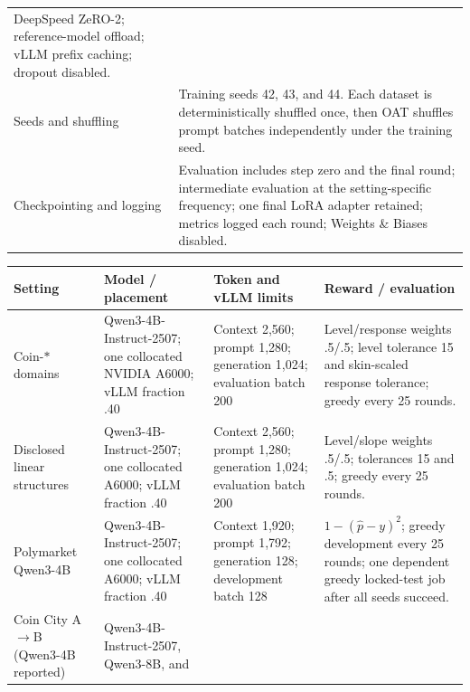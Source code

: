 \begin{center}
\begin{minipage}{\linewidth}
\begin{tabular}{p{.29\linewidth}p{.66\linewidth}}
DeepSpeed ZeRO-2; reference-model offload; vLLM prefix caching; dropout disabled. \\
Seeds and shuffling & Training seeds 42, 43, and 44.  Each dataset is deterministically
shuffled once, then OAT shuffles prompt batches independently under the training seed. \\
Checkpointing and logging & Evaluation includes step zero and the final round;
intermediate evaluation at the setting-specific frequency; one final LoRA adapter retained; metrics
logged each round; Weights \& Biases disabled. \\
\bottomrule
\end{tabular}
\end{minipage}
\end{center}

\begin{center}
\begin{minipage}{\linewidth}
\centering
{}
\label{tab:exp3-setting-specific}
\scriptsize
\setlength{\tabcolsep}{2pt}
\begin{tabular}{p{.18\linewidth}p{.25\linewidth}p{.23\linewidth}p{.28\linewidth}}
\toprule
\textbf{Setting} & \textbf{Model / placement} & \textbf{Token and vLLM limits} &
\textbf{Reward / evaluation} \\
\midrule
Coin-$*$ domains & Qwen3-4B-Instruct-2507; one collocated NVIDIA A6000;
vLLM fraction .40 & Context 2,560; prompt 1,280; generation 1,024; evaluation batch
200 & Level/response weights .5/.5; level tolerance 15 and skin-scaled response
tolerance; greedy every 25 rounds. \\
Disclosed linear structures & Qwen3-4B-Instruct-2507; one collocated A6000;
vLLM fraction .40 & Context 2,560; prompt 1,280; generation 1,024; evaluation batch
200 & Level/slope weights .5/.5; tolerances 15 and .5; greedy every 25 rounds. \\
Polymarket Qwen3-4B & Qwen3-4B-Instruct-2507; one collocated A6000; vLLM fraction
.40 & Context 1,920; prompt 1,792; generation 128; development batch 128 &
$1-(\hat p-y)^2$; greedy development every 25 rounds; one dependent greedy locked-test
job after all seeds succeed. \\
Coin City A$\to$B (Qwen3-4B reported) & Qwen3-4B-Instruct-2507, Qwen3-8B, and

\end{tabular}
\end{minipage}
\end{center}

